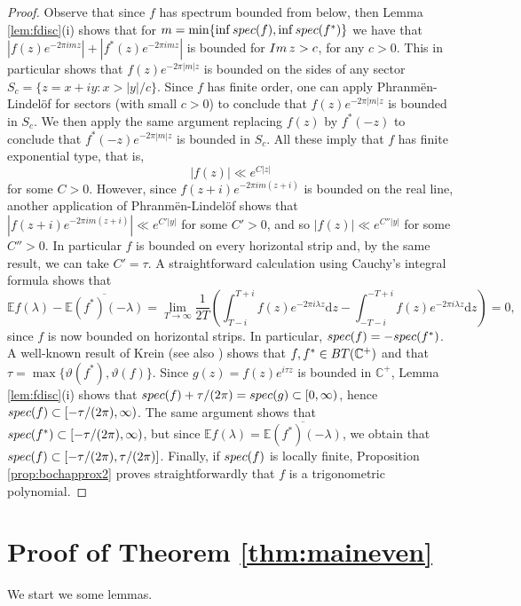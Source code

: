 \documentclass[a4paper,reqno,12pt]{amsart}
\newcommand{\E}{\mathcal{E}}
\renewcommand{\H}{\mathbb{C}^+}
\newcommand{\im}{{\rm Im}\,}
\newcommand{\la}{\lambda}
\renewcommand{\d}{\mathrm{d}}
\newcommand{\1}{{\bf 1}}
\renewcommand{\E}{\mathbb{E}}
\newcommand{\ov}[1]{\overline{#1}}
\newcommand{\bt}{{\rm BT}}
\renewcommand{\1}{{\bo 1}}
\newcommand{\spec}{{\rm spec}}
\begin{document}
\begin{proof}
Observe that since $f$  has spectrum bounded from below, then Lemma \ref{lem:fdisc}(i) shows that for $m=\min\{\inf \spec(f),\inf \spec(f^*)\}$ we have that $|f(z)e^{-2\pi i m z}|+|f^*(z)e^{-2\pi i m z}|$ is bounded for $\im z>c$, for any $c>0$. This in particular shows that $f(z)e^{-2\pi |m|  z}$ is bounded on the sides of any sector $S_c=\{z=x+iy : x >|y|/c\}$. Since $f$ has finite order, one can apply Phranm\"en-Lindel\"of for sectors (with small $c>0$) \cite[Thm. 1, p. 37]{L2} to conclude that $f(z)e^{-2\pi |m| z}$ is bounded in $S_c$. We then apply the same argument replacing $f(z)$ by $f^*(-z)$ to conclude that $f^*(-z)e^{-2\pi |m| z}$ is bounded in $S_c$. All these imply that $f$ has finite exponential type, that is,
$$
|f(z)| \ll e^{C|z|}
$$
for some $C>0$. However, since $f(z+i)e^{-2\pi i m (z+i)}$ is bounded on the real line, another application of Phranm\"en-Lindel\"of \cite[Thm. 3, p. 38]{L2} shows that $|f(z+i)e^{-2\pi i m (z+i)}| \ll e^{C'|y|} $ for some $C'>0$, and so $|f(z)|\ll e^{C''|y|}$ for some $C''>0$. In particular $f$ is bounded on every horizontal strip and, by the same result, we can take $C'=\tau$. A straightforward calculation using Cauchy's integral formula shows that
$$
\E f(\la)-\ov{\E (f^*)(-\la)} = \lim_{T\to\infty}\frac{1}{2T} \left( \int_{T-i}^{T+i} f(z)e^{-2\pi i \la z}\d z - \int_{-T-i}^{-T+i} f(z)e^{-2\pi i \la  z}\d z \right)=0,
$$
since $f$ is now bounded on horizontal strips. In particular, $\spec(f)=-\spec(f^*)$. A well-known result of Krein \cite{Kr} (see also \cite[Thm. 1, p. 115]{L2}) shows that $f,f^*\in \bt(\H)$ and that $\tau=\max\{\vartheta(f^*),\vartheta(f)\}$. Since $g(z)=f(z)e^{i \tau z}$ is bounded in $\H$, Lemma \ref{lem:fdisc}(i) shows that 
$\spec(f) +\tau/(2\pi)= \spec(g)\subset [0,\infty)$,
hence $\spec(f)\subset [-\tau/(2\pi),\infty)$. The same argument shows that $\spec(f^*)\subset [-\tau/(2\pi),\infty)$, but since $\E f(\la)=\ov{\E (f^*)(-\la)}$, we obtain that $\spec(f)\subset [-\tau/(2\pi),\tau/(2\pi)]$. Finally, if $\spec(f)$ is locally finite, Proposition \ref{prop:bochapprox2} proves straightforwardly that $f$ is a trigonometric polynomial.
\end{proof}

\section{Proof of Theorem \ref{thm:maineven}}

We start we some lemmas.
\end{document}
